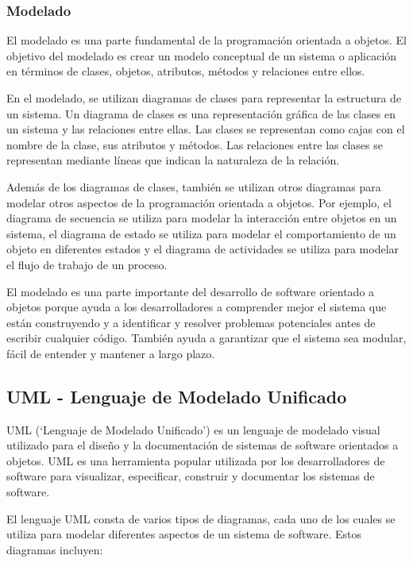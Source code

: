 \documentclass[executivepaper]{article}
\begin{document}
\subsubsection{Modelado}
El modelado es una parte fundamental de la programación orientada a objetos. El objetivo del modelado es crear un modelo conceptual de un sistema o aplicación en términos de clases, objetos, atributos, métodos y relaciones entre ellos.

En el modelado, se utilizan diagramas de clases para representar la estructura de un sistema. Un diagrama de clases es una representación gráfica de las clases en un sistema y las relaciones entre ellas. Las clases se representan como cajas con el nombre de la clase, sus atributos y métodos. Las relaciones entre las clases se representan mediante líneas que indican la naturaleza de la relación.

Además de los diagramas de clases, también se utilizan otros diagramas para modelar otros aspectos de la programación orientada a objetos. Por ejemplo, el diagrama de secuencia se utiliza para modelar la interacción entre objetos en un sistema, el diagrama de estado se utiliza para modelar el comportamiento de un objeto en diferentes estados y el diagrama de actividades se utiliza para modelar el flujo de trabajo de un proceso.

El modelado es una parte importante del desarrollo de software orientado a objetos porque ayuda a los desarrolladores a comprender mejor el sistema que están construyendo y a identificar y resolver problemas potenciales antes de escribir cualquier código. También ayuda a garantizar que el sistema sea modular, fácil de entender y mantener a largo plazo.

\subsection{UML - Lenguaje de Modelado Unificado}

UML (\enquote*{Lenguaje de Modelado Unificado}) es un lenguaje de modelado visual utilizado para el diseño y la documentación de sistemas de software orientados a objetos. UML es una herramienta popular utilizada por los desarrolladores de software para visualizar, especificar, construir y documentar los sistemas de software.

El lenguaje UML consta de varios tipos de diagramas, cada uno de los cuales se utiliza para modelar diferentes aspectos de un sistema de software. Estos diagramas incluyen:
\end{document}
